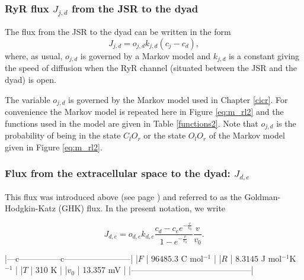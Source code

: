 \subsubsection{RyR flux $J_{j,d}$ from the JSR to the dyad}
The
flux from the JSR to the dyad can be written in the form
\begin{equation}
J_{j,d}=o_{j,d}k_{j,d}\left(  c_{j}-c_{d}\right), \label{J_jd}
\end{equation}
where, as usual, $o_{j,d}$ is governed by a Markov model and $k_{j,d}$ is a
constant giving the speed of diffusion when the RyR channel (situated between
the JSR and the dyad) is open.

The variable $o_{j,d}$ is governed by the Markov model
used in Chapter \ref{cicr}. For convenience the Markov model is repeated here in Figure \ref{eq:m_rl2} and  the functions
used in the model are given in Table \ref{functions2}. Note that $o_{j,d}$ is the probability of being in the state $C_lO_r$ or the state $O_lO_r$ of the Markov model given in Figure \ref{eq:m_rl2}.





\subsubsection{Flux from the extracellular space to the dyad: $J_{d,e}$}

 This flux was introduced above (see page \pageref{GHK}) and referred to as the Goldman-Hodgkin-Katz (GHK) flux. In the present notation, we write

\begin{equation}
J_{d,e}=o_{d,e} k_{d,e} \frac{c_d-c_{e}e^{-\frac{v}{v_0}}}{1-e^{-\frac{v}{v_0}}}\frac{v}{v_0}.\label{J_ed}
\end{equation}

|---c---------------c------------------------|
|$F$   | $96485.3$ C mol$^{-1}$              |
|$R$   | $8.3145$ J mol$^{-1}$K$^{-1}$       |
|$T$   | 310 K                               |
|$v_0$ | 13.357 mV                           |
|--------------------------------------------|

